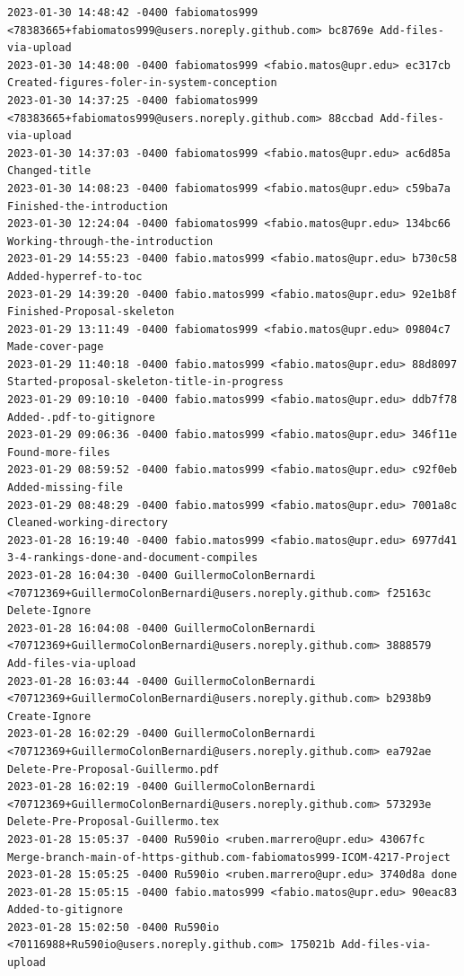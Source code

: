 \documentclass[12pt]{article}
\begin{document}
\begin{lstlisting}
2023-01-30 14:48:42 -0400 fabiomatos999 <78383665+fabiomatos999@users.noreply.github.com> bc8769e Add-files-via-upload
2023-01-30 14:48:00 -0400 fabiomatos999 <fabio.matos@upr.edu> ec317cb Created-figures-foler-in-system-conception
2023-01-30 14:37:25 -0400 fabiomatos999 <78383665+fabiomatos999@users.noreply.github.com> 88ccbad Add-files-via-upload
2023-01-30 14:37:03 -0400 fabiomatos999 <fabio.matos@upr.edu> ac6d85a Changed-title
2023-01-30 14:08:23 -0400 fabiomatos999 <fabio.matos@upr.edu> c59ba7a Finished-the-introduction
2023-01-30 12:24:04 -0400 fabiomatos999 <fabio.matos@upr.edu> 134bc66 Working-through-the-introduction
2023-01-29 14:55:23 -0400 fabio.matos999 <fabio.matos@upr.edu> b730c58 Added-hyperref-to-toc
2023-01-29 14:39:20 -0400 fabio.matos999 <fabio.matos@upr.edu> 92e1b8f Finished-Proposal-skeleton
2023-01-29 13:11:49 -0400 fabiomatos999 <fabio.matos@upr.edu> 09804c7 Made-cover-page
2023-01-29 11:40:18 -0400 fabio.matos999 <fabio.matos@upr.edu> 88d8097 Started-proposal-skeleton-title-in-progress
2023-01-29 09:10:10 -0400 fabio.matos999 <fabio.matos@upr.edu> ddb7f78 Added-.pdf-to-gitignore
2023-01-29 09:06:36 -0400 fabio.matos999 <fabio.matos@upr.edu> 346f11e Found-more-files
2023-01-29 08:59:52 -0400 fabio.matos999 <fabio.matos@upr.edu> c92f0eb Added-missing-file
2023-01-29 08:48:29 -0400 fabio.matos999 <fabio.matos@upr.edu> 7001a8c Cleaned-working-directory
2023-01-28 16:19:40 -0400 fabio.matos999 <fabio.matos@upr.edu> 6977d41 3-4-rankings-done-and-document-compiles
2023-01-28 16:04:30 -0400 GuillermoColonBernardi <70712369+GuillermoColonBernardi@users.noreply.github.com> f25163c Delete-Ignore
2023-01-28 16:04:08 -0400 GuillermoColonBernardi <70712369+GuillermoColonBernardi@users.noreply.github.com> 3888579 Add-files-via-upload
2023-01-28 16:03:44 -0400 GuillermoColonBernardi <70712369+GuillermoColonBernardi@users.noreply.github.com> b2938b9 Create-Ignore
2023-01-28 16:02:29 -0400 GuillermoColonBernardi <70712369+GuillermoColonBernardi@users.noreply.github.com> ea792ae Delete-Pre-Proposal-Guillermo.pdf
2023-01-28 16:02:19 -0400 GuillermoColonBernardi <70712369+GuillermoColonBernardi@users.noreply.github.com> 573293e Delete-Pre-Proposal-Guillermo.tex
2023-01-28 15:05:37 -0400 Ru590io <ruben.marrero@upr.edu> 43067fc Merge-branch-main-of-https-github.com-fabiomatos999-ICOM-4217-Project
2023-01-28 15:05:25 -0400 Ru590io <ruben.marrero@upr.edu> 3740d8a done
2023-01-28 15:05:15 -0400 fabio.matos999 <fabio.matos@upr.edu> 90eac83 Added-to-gitignore
2023-01-28 15:02:50 -0400 Ru590io <70116988+Ru590io@users.noreply.github.com> 175021b Add-files-via-upload

\end{lstlisting}
\end{document}
